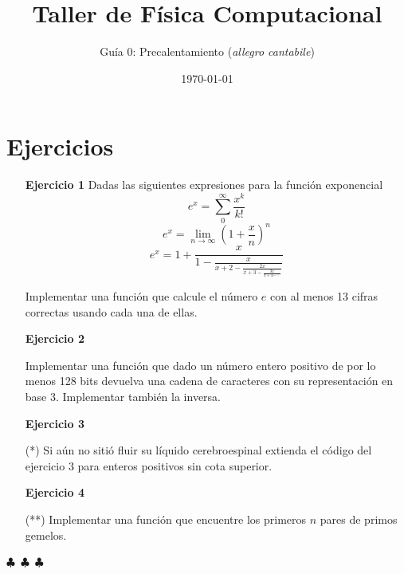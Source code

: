 \documentclass[a4paper,12pt]{article}
\begin{document}
\title{Taller de Física Computacional}

\author{Guía 0: Precalentamiento ({\em allegro cantabile})}

\date{\today}

\maketitle

\section*{Ejercicios}
\vspace{0.5cm}
\begin{enumerate}
    \item[\bf Ejercicio 1] Dadas las siguientes expresiones para la función exponencial 
    \begin{equation}
    	e^x = \sum_0^\infty \frac{x^k}{k!}
    \end{equation}
    \vspace{2mm}
    \begin{equation}
    	e^x = \lim_{n \to \infty} \left( 1 + \frac{x}{n}\right)^n
    \end{equation} 
    \vspace{2mm}
    \begin{equation}
    e^{x}=1+\frac{x}{1-\frac{x}{x+2-\frac{2 x}{x+3-\frac{3 x}{x+4-\ddots}}}}	
    \end{equation}

    	Implementar una función que calcule el número $e$ con al menos 13 cifras correctas usando cada una de ellas.
    	
    \item[\bf Ejercicio 2]
    	
    	Implementar una función que dado un número entero positivo de por lo menos 128 bits devuelva una cadena de caracteres con su representación en base 3. Implementar también la inversa.
    	
    \item[\bf Ejercicio 3] 
    
    (*) Si aún no sitió fluir su líquido cerebroespinal extienda el código del ejercicio 3 para enteros positivos sin cota superior. 
    
    \item[\bf Ejercicio 4] 
    
    (**) Implementar una función que encuentre los primeros $n$ pares de primos gemelos. 
    
\end{enumerate}

\begin{center}
    $\clubsuit$~$\clubsuit$~$\clubsuit$
  \end{center}
\end{document}
